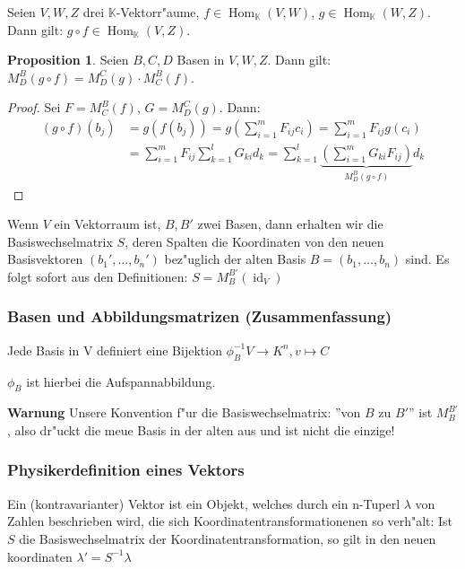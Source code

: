 \documentclass[11pt]{article}
\DeclareMathOperator{\mHom}{Hom}
\DeclareMathOperator{\mId}{id}
\theoremstyle{remark}
\theoremstyle{definition}
\newtheorem*{proposition}{Proposition}
\theoremstyle{remark}
\begin{document}
Seien \(V, W, Z\) drei \(\mathbb{K}\)-Vektorr"aume, \(f \in \mHom_\mathbb{K}(V, W)\), \(g \in \mHom_\mathbb{K}(W,Z)\). Dann gilt: \(g\circ f \in \mHom_\mathbb{K}(V,Z)\).

\begin{proposition}
	 Seien \(B,C,D\) Basen in
	\(V,W,Z\). Dann gilt: \(M^B_D(g\circ f) = M^C_D(g)\cdot M^B_C(f)\).
\end{proposition}
\begin{proof}
 Sei \(F = M^B_C(f)\), \(G = M^C_D(g)\). Dann:
 \begin{align*}
 (g\circ f)(b_j) &= g(f(b_j)) = g\left(\sum_{i=1}^m F_{ij}c_i\right) = \sum_{i=1}^mF_{ij}g(c_i) \\&= \sum_{i=1}^m F_{ij}\sum_{k=1}^lG_{ki}d_k = \sum_{k=1}^l\underbrace{\left(\sum_{i=1}^mG_{ki}F_{ij}\right)}_{M^B_D(g\circ f)}d_k
 \end{align*}
\end{proof}

Wenn \(V\) ein Vektorraum ist, \(B,B'\) zwei Basen, dann erhalten wir die
 Basiswechselmatrix \(S\), deren Spalten die Koordinaten von den neuen
 Basisvektoren \((b_1', \dots, b_n')\) bez"uglich der alten Basis \(B = (b_1,
 \dots, b_n)\) sind. Es folgt sofort aus den Definitionen:
 \(S=M^{B'}_B(\mId_V)\)


\subsubsection{Basen und Abbildungsmatrizen (Zusammenfassung)}
\label{sec:baab}
Jede Basis in V definiert eine Bijektion $\phi_B^{-1}V\rightarrow K^n, v\mapsto C$
\begin{relation}
  $\phi_B$ ist hierbei die Aufspannabbildung.  
\end{relation}

\textbf{Warnung} Unsere Konvention f"ur die Basiswechselmatrix: ''von $B$ zu
$B'$'' ist $M^{B'}_B$, also dr"uckt die meue Basis in der alten aus und ist
nicht die einzige!

\subsubsection{Physikerdefinition eines Vektors}
\label{sec:phyv}

Ein (kontravarianter) Vektor ist ein Objekt, welches durch ein n-Tuperl \(\lambda\)
von Zahlen beschrieben wird, die sich Koordinatentransformationenen so
verh"alt: Ist $S$ die Basiswechselmatrix der Koordinatentransformation, so gilt
in den neuen koordinaten $\lambda'=S^{-1}\lambda$
\end{document}
